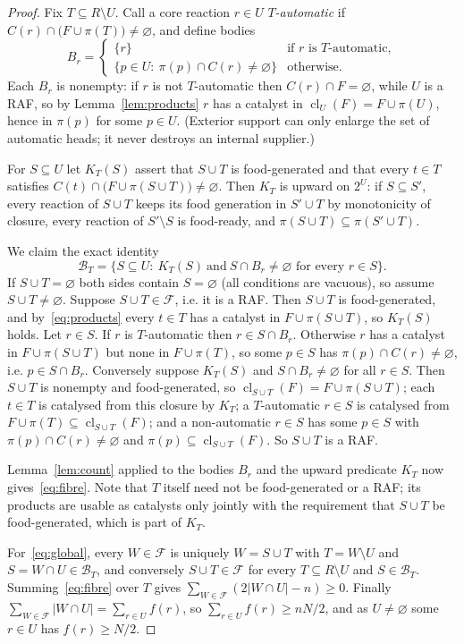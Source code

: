 \documentclass[11pt,a4paper]{article}
\theoremstyle{plain}
\theoremstyle{definition}
\theoremstyle{remark}
\newcommand{\FF}{\mathcal F}
\newcommand{\BB}{\mathcal B}
\newcommand{\cl}{\operatorname{cl}}
\begin{document}
\begin{proof}
Fix $T\subseteq R\setminus U$. Call a core reaction $r\in U$ \emph{$T$-automatic} if
$C(r)\cap\bigl(F\cup\pi(T)\bigr)\neq\varnothing$, and define bodies
\[
B_r=\begin{cases}\{r\} & \text{if $r$ is $T$-automatic},\\[2pt]
\{p\in U:\ \pi(p)\cap C(r)\neq\varnothing\} & \text{otherwise.}\end{cases}
\]
Each $B_r$ is nonempty: if $r$ is not $T$-automatic then $C(r)\cap F=\varnothing$, while
$U$ is a RAF, so by Lemma~\ref{lem:products} $r$ has a catalyst in
$\cl_U(F)=F\cup\pi(U)$, hence in $\pi(p)$ for some $p\in U$. (Exterior support can only
enlarge the set of automatic heads; it never destroys an internal supplier.)

For $S\subseteq U$ let $K_T(S)$ assert that $S\cup T$ is food-generated and that every
$t\in T$ satisfies $C(t)\cap\bigl(F\cup\pi(S\cup T)\bigr)\neq\varnothing$. Then $K_T$ is
upward on $2^U$: if $S\subseteq S'$, every reaction of $S\cup T$ keeps its food generation
in $S'\cup T$ by monotonicity of closure, every reaction of $S'\setminus S$ is food-ready,
and $\pi(S\cup T)\subseteq\pi(S'\cup T)$.

We claim the exact identity
\begin{equation}\label{eq:exact-fibre}
\BB_T=\{S\subseteq U:\ K_T(S)\ \text{and}\ S\cap B_r\neq\varnothing\text{ for every }r\in S\}.
\end{equation}
If $S\cup T=\varnothing$ both sides contain $S=\varnothing$ (all conditions are vacuous), so
assume $S\cup T\neq\varnothing$. Suppose $S\cup T\in\FF$, i.e. it is a RAF. Then $S\cup T$
is food-generated, and by~\eqref{eq:products} every $t\in T$ has a catalyst in
$F\cup\pi(S\cup T)$, so $K_T(S)$ holds. Let $r\in S$. If $r$ is $T$-automatic then
$r\in S\cap B_r$. Otherwise $r$ has a catalyst in $F\cup\pi(S\cup T)$ but none in
$F\cup\pi(T)$, so some $p\in S$ has $\pi(p)\cap C(r)\neq\varnothing$, i.e. $p\in S\cap B_r$.
Conversely suppose $K_T(S)$ and $S\cap B_r\neq\varnothing$ for all $r\in S$. Then $S\cup T$
is nonempty and food-generated, so $\cl_{S\cup T}(F)=F\cup\pi(S\cup T)$; each $t\in T$ is
catalysed from this closure by $K_T$; a $T$-automatic $r\in S$ is catalysed from
$F\cup\pi(T)\subseteq\cl_{S\cup T}(F)$; and a non-automatic $r\in S$ has some $p\in S$ with
$\pi(p)\cap C(r)\neq\varnothing$ and $\pi(p)\subseteq\cl_{S\cup T}(F)$. So $S\cup T$ is a RAF.

Lemma~\ref{lem:count} applied to the bodies $B_r$ and the upward predicate $K_T$ now
gives~\eqref{eq:fibre}. Note that $T$ itself need not be food-generated or a RAF; its
products are usable as catalysts only jointly with the requirement that $S\cup T$ be
food-generated, which is part of $K_T$.

For~\eqref{eq:global}, every $W\in\FF$ is uniquely $W=S\cup T$ with $T=W\setminus U$ and
$S=W\cap U\in\BB_T$, and conversely $S\cup T\in\FF$ for every $T\subseteq R\setminus U$ and
$S\in\BB_T$. Summing~\eqref{eq:fibre} over $T$ gives
$\sum_{W\in\FF}(2|W\cap U|-n)\ge0$. Finally $\sum_{W\in\FF}|W\cap U|=\sum_{r\in U}f(r)$, so
$\sum_{r\in U}f(r)\ge nN/2$, and as $U\neq\varnothing$ some $r\in U$ has $f(r)\ge N/2$.
\end{proof}
\end{document}
